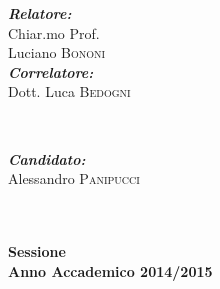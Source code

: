 \begin{titlepage}

\begin{minipage}[t]{5cm}
	\begin{flushleft} \Large
		\emph{ \bfseries Relatore:} \\
		Chiar.mo Prof. \\ Luciano \textsc{Bononi} %
		\\[0.1cm] %

		\emph{ \bfseries Correlatore:} \\
		Dott. Luca \textsc{Bedogni} %
	\end{flushleft}

\end{minipage}
~
\begin{minipage}[t]{5cm}
	\begin{flushright} \Large
		\emph{ \bfseries Candidato:}\\
		Alessandro \textsc{Panipucci}\\[0.1cm]
	\end{flushright}
	
\end{minipage}\\[1cm]

\HRule \\[0.2cm]

{ \bfseries \textsc \textbf \large {} {Sessione}\\[0.2cm]
	 Anno Accademico 2014/2015}


\vfill %

\end{titlepage}

\pagestyle{fancy}
\makeatletter
\newcommand{\unchapter}[1]{%
  \begingroup
  \let\@makechapterhead\@gobble %
  \chapter{#1}
  \endgroup
}
\makeatother

